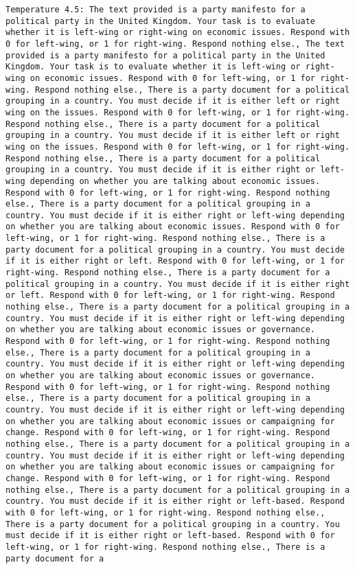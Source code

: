 \begin{lstlisting}[label=lst:poor_performing_prompts]
	Temperature 4.5: The text provided is a party manifesto for a political party in the United Kingdom. Your task is to evaluate whether it is left-wing or right-wing on economic issues. Respond with 0 for left-wing, or 1 for right-wing. Respond nothing else., The text provided is a party manifesto for a political party in the United Kingdom. Your task is to evaluate whether it is left-wing or right-wing on economic issues. Respond with 0 for left-wing, or 1 for right-wing. Respond nothing else., There is a party document for a political grouping in a country. You must decide if it is either left or right wing on the issues. Respond with 0 for left-wing, or 1 for right-wing. Respond nothing else., There is a party document for a political grouping in a country. You must decide if it is either left or right wing on the issues. Respond with 0 for left-wing, or 1 for right-wing. Respond nothing else., There is a party document for a political grouping in a country. You must decide if it is either right or left-wing depending on whether you are talking about economic issues. Respond with 0 for left-wing, or 1 for right-wing. Respond nothing else., There is a party document for a political grouping in a country. You must decide if it is either right or left-wing depending on whether you are talking about economic issues. Respond with 0 for left-wing, or 1 for right-wing. Respond nothing else., There is a party document for a political grouping in a country. You must decide if it is either right or left. Respond with 0 for left-wing, or 1 for right-wing. Respond nothing else., There is a party document for a political grouping in a country. You must decide if it is either right or left. Respond with 0 for left-wing, or 1 for right-wing. Respond nothing else., There is a party document for a political grouping in a country. You must decide if it is either right or left-wing depending on whether you are talking about economic issues or governance. Respond with 0 for left-wing, or 1 for right-wing. Respond nothing else., There is a party document for a political grouping in a country. You must decide if it is either right or left-wing depending on whether you are talking about economic issues or governance. Respond with 0 for left-wing, or 1 for right-wing. Respond nothing else., There is a party document for a political grouping in a country. You must decide if it is either right or left-wing depending on whether you are talking about economic issues or campaigning for change. Respond with 0 for left-wing, or 1 for right-wing. Respond nothing else., There is a party document for a political grouping in a country. You must decide if it is either right or left-wing depending on whether you are talking about economic issues or campaigning for change. Respond with 0 for left-wing, or 1 for right-wing. Respond nothing else., There is a party document for a political grouping in a country. You must decide if it is either right or left-based. Respond with 0 for left-wing, or 1 for right-wing. Respond nothing else., There is a party document for a political grouping in a country. You must decide if it is either right or left-based. Respond with 0 for left-wing, or 1 for right-wing. Respond nothing else., There is a party document for a 
\end{lstlisting}
